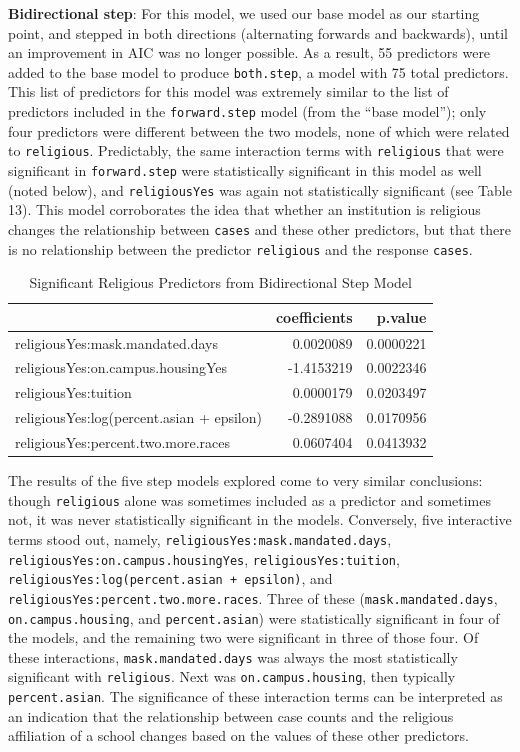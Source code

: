 \documentclass[
]{article}
\begin{document}
\textbf{Bidirectional step}: For this model, we used our base model as
our starting point, and stepped in both directions (alternating forwards
and backwards), until an improvement in AIC was no longer possible. As a
result, 55 predictors were added to the base model to produce
\texttt{both.step}, a model with 75 total predictors. This list of
predictors for this model was extremely similar to the list of
predictors included in the \texttt{forward.step} model (from the ``base
model''); only four predictors were different between the two models,
none of which were related to \texttt{religious}. Predictably, the same
interaction terms with \texttt{religious} that were significant in
\texttt{forward.step} were statistically significant in this model as
well (noted below), and \texttt{religiousYes} was again not
statistically significant (see Table 13). This model corroborates the
idea that whether an institution is religious changes the relationship
between \texttt{cases} and these other predictors, but that there is no
relationship between the predictor \texttt{religious} and the response
\texttt{cases}.

\begin{table}

\caption{\label{tab:unnamed-chunk-28}Significant Religious Predictors from Bidirectional Step Model}
\centering
\begin{tabular}[t]{l|r|r}
\hline
  & coefficients & p.value\\
\hline
religiousYes:mask.mandated.days & 0.0020089 & 0.0000221\\
\hline
religiousYes:on.campus.housingYes & -1.4153219 & 0.0022346\\
\hline
religiousYes:tuition & 0.0000179 & 0.0203497\\
\hline
religiousYes:log(percent.asian + epsilon) & -0.2891088 & 0.0170956\\
\hline
religiousYes:percent.two.more.races & 0.0607404 & 0.0413932\\
\hline
\end{tabular}
\end{table}

The results of the five step models explored come to very similar
conclusions: though \texttt{religious} alone was sometimes included as a
predictor and sometimes not, it was never statistically significant in
the models. Conversely, five interactive terms stood out, namely,
\texttt{religiousYes:mask.mandated.days},
\texttt{religiousYes:on.campus.housingYes},
\texttt{religiousYes:tuition},
\texttt{religiousYes:log(percent.asian\ +\ epsilon)}, and
\texttt{religiousYes:percent.two.more.races}. Three of these
(\texttt{mask.mandated.days}, \texttt{on.campus.housing}, and
\texttt{percent.asian}) were statistically significant in four of the
models, and the remaining two were significant in three of those four.
Of these interactions, \texttt{mask.mandated.days} was always the most
statistically significant with \texttt{religious}. Next was
\texttt{on.campus.housing}, then typically \texttt{percent.asian}. The
significance of these interaction terms can be interpreted as an
indication that the relationship between case counts and the religious
affiliation of a school changes based on the values of these other
predictors.
\end{document}
